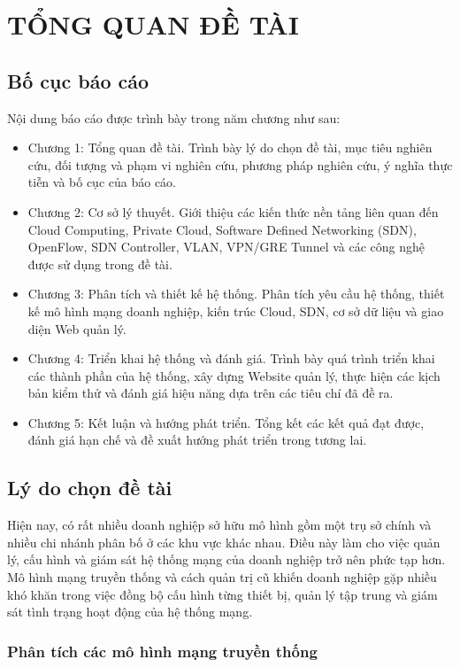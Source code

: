 \section{TỔNG QUAN ĐỀ TÀI}

\subsection{Bố cục báo cáo}
Nội dung báo cáo được trình bày trong năm chương như sau:
\begin{itemize}
    \item Chương 1: Tổng quan đề tài. Trình bày lý do chọn đề tài, mục tiêu nghiên cứu, đối tượng và phạm vi nghiên cứu, phương pháp nghiên cứu, ý nghĩa thực tiễn và bố cục của báo cáo.
    \item Chương 2: Cơ sở lý thuyết. Giới thiệu các kiến thức nền tảng liên quan đến Cloud Computing, Private Cloud, Software Defined Networking (SDN), OpenFlow, SDN Controller, VLAN, VPN/GRE Tunnel và các công nghệ được sử dụng trong đề tài.
    \item Chương 3: Phân tích và thiết kế hệ thống. Phân tích yêu cầu hệ thống, thiết kế mô hình mạng doanh nghiệp, kiến trúc Cloud, SDN, cơ sở dữ liệu và giao diện Web quản lý.
    \item Chương 4: Triển khai hệ thống và đánh giá. Trình bày quá trình triển khai các thành phần của hệ thống, xây dựng Website quản lý, thực hiện các kịch bản kiểm thử và đánh giá hiệu năng dựa trên các tiêu chí đã đề ra.
    \item Chương 5: Kết luận và hướng phát triển. Tổng kết các kết quả đạt được, đánh giá hạn chế và đề xuất hướng phát triển trong tương lai.
\end{itemize}

\subsection{Lý do chọn đề tài}
Hiện nay, có rất nhiều doanh nghiệp sở hữu mô hình gồm một trụ sở chính và nhiều chi nhánh phân bố ở các khu vực khác nhau. Điều này làm cho việc quản lý, cấu hình và giám sát hệ thống mạng của doanh nghiệp trở nên phức tạp hơn. Mô hình mạng truyền thống và cách quản trị cũ khiến doanh nghiệp gặp nhiều khó khăn trong việc đồng bộ cấu hình từng thiết bị, quản lý tập trung và giám sát tình trạng hoạt động của hệ thống mạng.

\subsubsection{Phân tích các mô hình mạng truyền thống}

